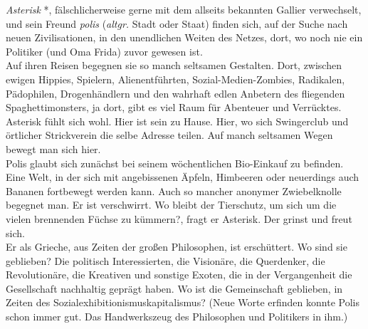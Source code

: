



\textit{Asterisk} *, fälschlicherweise gerne mit dem allseits bekannten Gallier verwechselt, und sein Freund \textit{polis} (\textit{altgr.} Stadt oder Staat) finden sich, auf der Suche nach neuen Zivilisationen, in den unendlichen Weiten des Netzes, dort, wo noch nie ein Politiker (und Oma Frida) zuvor gewesen ist. 
\\
Auf ihren Reisen begegnen sie so manch seltsamen Gestalten. Dort, zwischen ewigen Hippies, Spielern, Alienentführten, Sozial-Medien-Zombies, Radikalen, Pädophilen, Drogenhändlern und den wahrhaft edlen Anbetern des fliegenden Spaghettimonsters, ja dort, gibt es viel Raum für Abenteuer und Verrücktes.
\\
Asterisk fühlt sich wohl. Hier ist sein zu Hause. Hier, wo sich Swingerclub und örtlicher Strickverein die selbe Adresse teilen. Auf manch seltsamen Wegen bewegt man sich hier. \\
Polis glaubt sich zunächst bei seinem wöchentlichen Bio-Einkauf zu befinden. Eine Welt, in der sich mit angebissenen Äpfeln, Himbeeren oder neuerdings auch Bananen fortbewegt werden kann. Auch so mancher anonymer Zwiebelknolle begegnet man. Er ist verschwirrt. \glqq Wo bleibt der Tierschutz, um sich um die vielen brennenden Füchse zu kümmern?\grqq, fragt er Asterisk. Der grinst und freut sich.
\\
Er als Grieche, aus Zeiten der großen Philosophen, ist erschüttert. Wo sind sie geblieben? Die politisch Interessierten, die Visionäre, die Querdenker, die Revolutionäre, die Kreativen und sonstige Exoten, die in der Vergangenheit die Gesellschaft nachhaltig geprägt haben. Wo ist die Gemeinschaft geblieben, in Zeiten des Sozialexhibitionismuskapitalismus? (Neue Worte erfinden konnte Polis schon immer gut. Das Handwerkszeug des Philosophen und Politikers in ihm.)
\\
